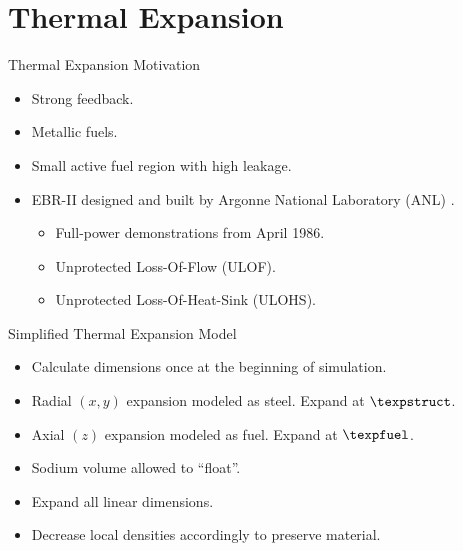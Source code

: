 \section{Thermal Expansion}
\label{sec:thermalExpansion}

\begin{frame}{Thermal Expansion Motivation}
  \begin{itemize}
    \item Strong feedback.
    \item Metallic fuels.
    \item Small active fuel region with high leakage.
    \item EBR-II designed and built by Argonne National Laboratory (ANL)
      \cite{PlentifulEnergy}.
      \begin{itemize}
        \item Full-power demonstrations from April 1986.
        \item Unprotected Loss-Of-Flow (ULOF).
        \item Unprotected Loss-Of-Heat-Sink (ULOHS).
      \end{itemize}
  \end{itemize}
\end{frame}

\begin{frame}{Simplified Thermal Expansion Model}
  \begin{itemize}
    \item Calculate dimensions once at the beginning of simulation.
    \item Radial $(x,y)$ expansion modeled as steel. Expand at $\texpstruct$.
    \item Axial $(z)$ expansion modeled as fuel. Expand at $\texpfuel$.
    \item Sodium volume allowed to ``float''.
    \item Expand all linear dimensions.
    \item Decrease local densities accordingly to preserve material.
  \end{itemize}
\end{frame}

